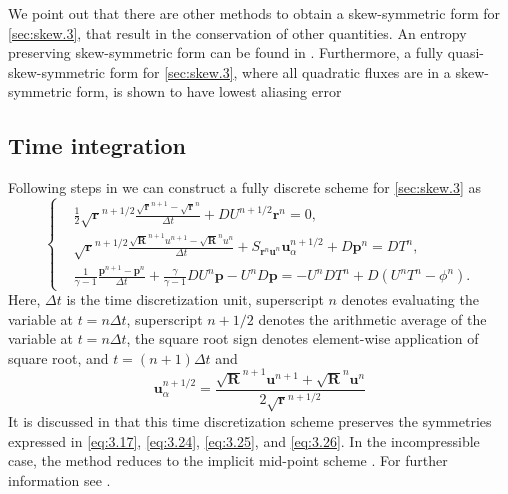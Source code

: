 We point out that there are other methods to obtain a skew-symmetric form for \eqref{sec:skew.3}, that result in the conservation of other quantities. An entropy preserving skew-symmetric form can be found in \cite{sjogreen2010skew}. Furthermore, a fully quasi-skew-symmetric form for \eqref{sec:skew.3}, where all quadratic fluxes are in a skew-symmetric form, is shown to have lowest aliasing error \cite{honein2004higher,honein2005numerical}

\subsection{Time integration}
Following steps in \cite{reiss2014conservative,morinishi2010skew} we can construct a fully discrete scheme for \eqref{sec:skew.3} as
\begin{equation} \label{eq:3.27}
	\left\{
	\begin{aligned}
	&\frac 1 2 \sqrt{\mathbf r} ^{n+1/2} \frac{\sqrt{\mathbf r}^{n+1} - \sqrt{\mathbf r}^{n}}{\Delta t} + DU^{n+1/2} \mathbf r^{n} = 0, \\
	& \sqrt{\mathbf r} ^{n+1/2}  \frac{\sqrt{ \mathbf R}^{n+1} u^{n+1} - \sqrt{\mathbf R}^{n}u^n}{\Delta t} + S_{\mathbf r^{n} \mathbf u^n} \mathbf u^{n+1/2}_\alpha + D \mathbf p^{n} = DT^{n}, \\
	& \frac 1 {\gamma -1} \frac{\mathbf p^{n+1} - \mathbf p^n}{\Delta t} + \frac{\gamma}{\gamma -1} D U^{n} \mathbf p - U^{n} D \mathbf p = - U^{n}D T^{n} + D (U^nT^n - \phi^n).
	\end{aligned}
	\right.
\end{equation}
Here, $\Delta t$ is the time discretization unit, superscript $n$ denotes evaluating the variable at $t = n\Delta t$, superscript $n+1/2$ denotes the arithmetic average of the variable at $t=n\Delta t$, the square root sign denotes element-wise application of square root,  and $t=(n+1)\Delta t$ and 
\begin{equation}
	\mathbf u_{\alpha}^{n+1/2} = \frac{\sqrt{\mathbf R}^{n+1} \mathbf u^{n+1} + \sqrt{\mathbf R}^{n} \mathbf u^{n}}{2\sqrt{\mathbf r}^{n+1/2} }
\end{equation}
It is discussed in \cite{reiss2014conservative} that this time discretization scheme preserves the symmetries expressed in \eqref{eq:3.17}, \eqref{eq:3.24}, \eqref{eq:3.25}, and \eqref{eq:3.26}. In the incompressible case, the method reduces to the implicit mid-point scheme \cite{hairer2006geometric}. For further information see \cite{reiss2014conservative,morinishi2010skew}.

